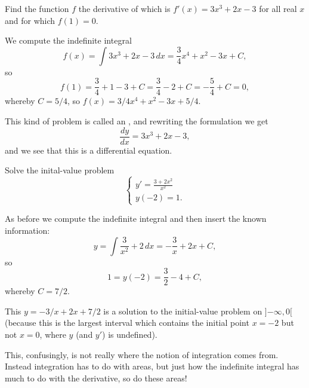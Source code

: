 \begin{example}
	Find the function $f$ the derivative of which is $f'(x) = 3 x^3 + 2 x - 3$ for all real $x$ and for which $f(1) = 0$.

	We compute the indefinite integral
	\[
		f(x) = \int 3 x^3 + 2 x - 3 \, d x = \frac{3}{4} x^4 + x^2 - 3 x + C,
	\]
	so
	\[
		f(1) = \frac{3}{4} + 1 - 3 + C = \frac{3}{4} - 2 + C = - \frac{5}{4} + C = 0,
	\]
	whereby $C = 5/4$, so $f(x) = 3/4 x^4 + x^2 - 3 x + 5/4$.
\end{example}

\noindent
This kind of problem is called an , and rewriting the formulation we get
\[
	\frac{d y}{d x} = 3 x^3 + 2 x - 3,
\]
and we see that this is a differential equation.

\begin{example}
	Solve the inital-value problem
	\[
		\begin{cases}
			y' = \frac{3 + 2 x^2}{x^2} \\
			y(-2) = 1.
		\end{cases}
	\]

	\noindent
	As before we compute the indefinite integral and then insert the known information:
	\[
		y = \int \frac{3}{x^2} + 2 \, d x = - \frac{3}{x} + 2 x + C,
	\]
	so
	\[
		1 = y(-2) = \frac{3}{2} - 4 + C,
	\]
	whereby $C = 7/2$.

	This $y = -3 / x + 2 x + 7/2$ is a solution to the initial-value problem on ${]{-\infty, 0}[}$ (because this is the largest interval which contains the initial point $x = -2$ but not $x = 0$, where $y$ (and $y'$) is undefined).
\end{example}

\noindent
This, confusingly, is not really where the notion of integration comes from.
Instead integration has to do with areas, but just how the indefinite integral has much to do with the derivative, so do these areas!
